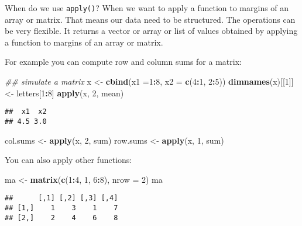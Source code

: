 \documentclass[
]{article}
\newenvironment{Shaded}{\begin{snugshade}}{\end{snugshade}}
\newcommand{\CommentTok}[1]{\textcolor[rgb]{0.56,0.35,0.01}{\textit{#1}}}
\newcommand{\DataTypeTok}[1]{\textcolor[rgb]{0.13,0.29,0.53}{#1}}
\newcommand{\DecValTok}[1]{\textcolor[rgb]{0.00,0.00,0.81}{#1}}
\newcommand{\KeywordTok}[1]{\textcolor[rgb]{0.13,0.29,0.53}{\textbf{#1}}}
\newcommand{\NormalTok}[1]{#1}
\newcommand{\OperatorTok}[1]{\textcolor[rgb]{0.81,0.36,0.00}{\textbf{#1}}}
\newcommand{\StringTok}[1]{\textcolor[rgb]{0.31,0.60,0.02}{#1}}
\begin{document}
When do we use \texttt{apply()}? When we want to apply a function to
margins of an array or matrix. That means our data need to be
structured. The operations can be very flexible. It returns a vector or
array or list of values obtained by applying a function to margins of an
array or matrix.

For example you can compute row and column sums for a matrix:

\begin{Shaded}
\begin{Highlighting}[]
\CommentTok{## simulate a matrix}
\NormalTok{x <-}\StringTok{ }\KeywordTok{cbind}\NormalTok{(}\DataTypeTok{x1 =}\DecValTok{1}\OperatorTok{:}\DecValTok{8}\NormalTok{, }\DataTypeTok{x2 =} \KeywordTok{c}\NormalTok{(}\DecValTok{4}\OperatorTok{:}\DecValTok{1}\NormalTok{, }\DecValTok{2}\OperatorTok{:}\DecValTok{5}\NormalTok{))}
\KeywordTok{dimnames}\NormalTok{(x)[[}\DecValTok{1}\NormalTok{]] <-}\StringTok{ }\NormalTok{letters[}\DecValTok{1}\OperatorTok{:}\DecValTok{8}\NormalTok{]}
\KeywordTok{apply}\NormalTok{(x, }\DecValTok{2}\NormalTok{, mean)}
\end{Highlighting}
\end{Shaded}

\begin{verbatim}
##  x1  x2 
## 4.5 3.0
\end{verbatim}

\begin{Shaded}
\begin{Highlighting}[]
\NormalTok{col.sums <-}\StringTok{ }\KeywordTok{apply}\NormalTok{(x, }\DecValTok{2}\NormalTok{, sum)}
\NormalTok{row.sums <-}\StringTok{ }\KeywordTok{apply}\NormalTok{(x, }\DecValTok{1}\NormalTok{, sum)}
\end{Highlighting}
\end{Shaded}

You can also apply other functions:

\begin{Shaded}
\begin{Highlighting}[]
\NormalTok{ma <-}\StringTok{ }\KeywordTok{matrix}\NormalTok{(}\KeywordTok{c}\NormalTok{(}\DecValTok{1}\OperatorTok{:}\DecValTok{4}\NormalTok{, }\DecValTok{1}\NormalTok{, }\DecValTok{6}\OperatorTok{:}\DecValTok{8}\NormalTok{), }\DataTypeTok{nrow =} \DecValTok{2}\NormalTok{)}
\NormalTok{ma}
\end{Highlighting}
\end{Shaded}

\begin{verbatim}
##      [,1] [,2] [,3] [,4]
## [1,]    1    3    1    7
## [2,]    2    4    6    8
\end{verbatim}
\end{document}
